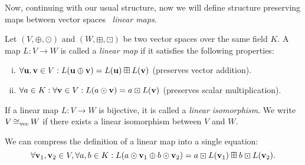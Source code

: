 Now, continuing with our usual structure, now we will define structure preserving maps between vector spaces \ie\ \emph{linear maps}.
\begin{definition}
    Let \((V, \oplus, \odot)\) and \((W, \boxplus, \boxdot)\) be two vector spaces over the same field \(K\). A map \(L: V \to W\) is called a \emph{linear map} if it satisfies the following properties:
    \begin{enumerate}[(i)]
        \item \(\forall \vb{u}, \vb{v} \in V: L(\vb{u} \oplus \vb{v}) = L(\vb{u}) \boxplus L(\vb{v})\) (preserves vector addition).
        \item \(\forall a \in K: \forall \vb{v} \in V: L(a \odot \vb{v}) = a \boxdot L(\vb{v})\) (preserves scalar multiplication).
    \end{enumerate}
    If a linear map \(L: V \to W\) is bijective, it is called a \emph{linear isomorphism}. We write \(V \operatorname{\cong_{\text{vec}}} W\) if there exists a linear isomorphism between \(V\) and \(W\).
\end{definition}
We can compress the definition of a linear map into a single equation:
\begin{equation}
    \forall \vb{v}_1, \vb{v}_2 \in V, \forall a, b \in K: L(a \odot \vb{v}_1 \oplus b \odot \vb{v}_2) = a \boxdot L(\vb{v}_1) \boxplus b \boxdot L(\vb{v}_2).
\end{equation}

